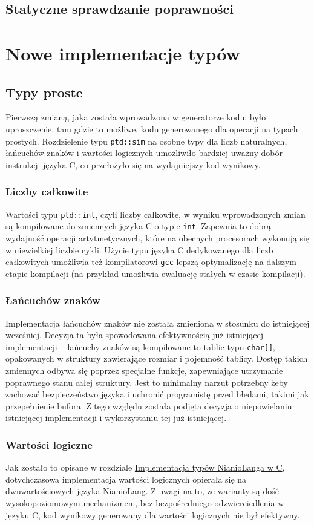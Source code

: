 \documentclass[licencjacka]{pracamgr}
\begin{document}
\section{Statyczne sprawdzanie poprawności}

\chapter{Nowe implementacje typów}
\section{Typy proste}
Pierwszą zmianą, jaka została wprowadzona w generatorze kodu, było uproszczenie,
tam gdzie to możliwe, kodu generowanego dla operacji na typach prostych.
Rozdzielenie typu \texttt{ptd::sim} na osobne typy dla liczb naturalnych,
łańcuchów znaków i wartości logicznych umożliwiło bardziej uważny dobór instrukcji języka C,
co przełożyło się na wydajniejszy kod wynikowy.

\subsection{Liczby całkowite}
Wartości typu \texttt{ptd::int}, czyli liczby całkowite, w wyniku wprowadzonych zmian są kompilowane
do zmiennych języka C o typie \texttt{int}. Zapewnia to dobrą wydajność operacji artytmetycznych,
które na obecnych procesorach wykonują się w niewielkiej liczbie cykli. Użycie typu języka C
dedykowanego dla liczb całkowitych umożliwia też kompilatorowi \texttt{gcc} lepszą optymalizację
na dalszym etapie kompilacji (na przykład umożliwia ewaluację stałych w czasie kompilacji).
\subsection{Łańcuchów znaków}
Implementacja łańcuchów znaków nie została zmieniona w stosunku do istniejącej wcześniej.
Decyzja ta była spowodowana efektywnością już istniejącej implementacji -- łańcuchy znaków
są kompilowane to tablic typu \texttt{char[]}, opakowanych w struktury zawierające
rozmiar i pojemność tablicy. Dostęp takich zmiennych odbywa się poprzez specjalne funkcje,
zapewniające utrzymanie poprawnego stanu całej struktury. Jest to minimalny narzut potrzebny żeby
zachować bezpieczeństwo języka i uchronić programistę przed błedami, takimi jak przepełnienie bufora.
Z tego względu została podjęta decyzja o niepowielaniu istniejącej implementacji i wykorzystaniu
tej już istniejącej.
\subsection{Wartości logiczne}
Jak zostało to opisane w rozdziale \hyperref[sec:c_types_implementation]{Implementacja typów NianioLanga w C}, dotychczasowa implementacja wartości logicznych opierała się na dwuwartościowych
języka NianioLang. Z uwagi na to, że warianty są dość wysokopoziomowym mechanizmem, bez
bezpośredniego odzwierciedlenia w języku C, kod wynikowy generowany dla wartości logicznych nie był
efektywny.
\end{document}
